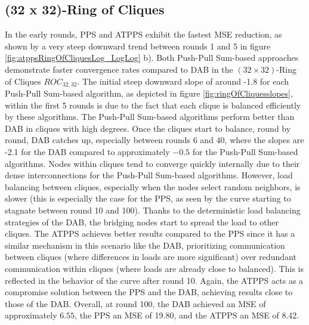 \subsection{(32 x 32)-Ring of Cliques}\label{subsec:32_32ROC}
In the early rounds, PPS and ATPPS exhibit the fastest MSE reduction, as shown by a very steep downward trend between rounds 1 and 5 in figure \ref{fig:atppsRingOfCliquesLog_LogLog} b). Both Push-Pull Sum-based approaches demonstrate faster convergence rates compared to DAB in the $(32\times 32)$-Ring of Cliques $ROC_{32,32}$. The initial steep downward slope of around -1.8 for each Push-Pull Sum-based algorithm, as depicted in figure \ref{fig:ringOfCliquesslopes}, within the first 5 rounds is due to the fact that each clique is balanced efficiently by these algorithms. The Push-Pull Sum-based algorithms perform better than DAB in cliques with high degrees. Once the cliques start to balance, round by round, DAB catches up, especially between rounds 6 and 40, where the slopes are -2.1 for the DAB compared to approximately $-0.5$ for the Push-Pull Sum-based algorithms. Nodes within cliques tend to converge quickly internally due to their dense interconnections for the Push-Pull Sum-based algorithms. However, load balancing between cliques, especially when the nodes select random neighbors, is slower (this is especially the case for the PPS, as seen by the curve starting to stagnate between round 10 and 100). Thanks to the deterministic load balancing strategies of the DAB, the bridging nodes start to spread the load to other cliques. The ATPPS achieves better results compared to the PPS since it has a similar mechanism in this scenario like the DAB, prioritizing communication between cliques (where differences in loads are more significant) over redundant communication within cliques (where loads are already close to balanced). This is reflected in the behavior of the curve after round 10. Again, the ATPPS acts as a compromise solution between the PPS and the DAB, achieving results close to those of the DAB. Overall, at round 100, the DAB achieved an MSE of approximately $6.55$, the PPS an MSE of 19.80, and the ATPPS an MSE of 8.42.

